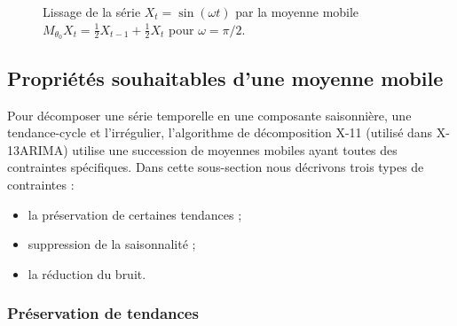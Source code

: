 \documentclass[
  11pt,
  french,
  a4paper]{article}
\newcommand\1{\mathds{1}}
\begin{document}
\begin{figure}[!ht]
\caption{Lissage de la série $X_t=\sin(\omega t)$ par la moyenne mobile $M_{\theta_0}X_t=\frac{1}{2}X_{t-1}+\frac{1}{2}X_{t}$ pour $\omega=\pi/2$.}\label{fig:exgainPhase}
\end{figure}

\hypertarget{propriuxe9tuxe9s-souhaitables-dune-moyenne-mobile}{%
\subsection{Propriétés souhaitables d'une moyenne mobile}\label{propriuxe9tuxe9s-souhaitables-dune-moyenne-mobile}}

Pour décomposer une série temporelle en une composante saisonnière, une tendance-cycle et l'irrégulier, l'algorithme de décomposition X-11 (utilisé dans X-13ARIMA) utilise une succession de moyennes mobiles ayant toutes des contraintes spécifiques.
Dans cette sous-section nous décrivons trois types de contraintes :

\begin{itemize}
\item
  la préservation de certaines tendances ;
\item
  suppression de la saisonnalité ;
\item
  la réduction du bruit.
\end{itemize}

\hypertarget{pruxe9servation-de-tendances}{%
\subsubsection{Préservation de tendances}\label{pruxe9servation-de-tendances}}
\end{document}
